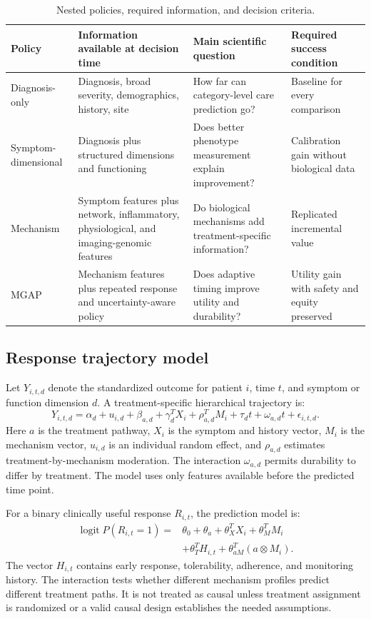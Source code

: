 \documentclass[conference]{IEEEtran}
\begin{document}
\begin{table}[t]
\centering
\caption{Nested policies, required information, and decision criteria.}
\label{tab:policies}
\small
\begin{tabular}{p{3.0cm}p{4.3cm}p{4.3cm}p{3.0cm}}
\toprule
Policy & Information available at decision time & Main scientific question & Required success condition \\
\midrule
Diagnosis-only & Diagnosis, broad severity, demographics, history, site & How far can category-level care prediction go? & Baseline for every comparison \\
Symptom-dimensional & Diagnosis plus structured dimensions and functioning & Does better phenotype measurement explain improvement? & Calibration gain without biological data \\
Mechanism & Symptom features plus network, inflammatory, physiological, and imaging-genomic features & Do biological mechanisms add treatment-specific information? & Replicated incremental value \\
MGAP & Mechanism features plus repeated response and uncertainty-aware policy & Does adaptive timing improve utility and durability? & Utility gain with safety and equity preserved \\
\bottomrule
\end{tabular}
\end{table}

\subsection{Response trajectory model}
Let $Y_{i,t,d}$ denote the standardized outcome for patient $i$, time $t$, and symptom or function dimension $d$. A treatment-specific hierarchical trajectory is:
\begin{equation}
Y_{i,t,d}=\alpha_d+u_{i,d}+\beta_{a,d}+\gamma_d^T X_i+\rho_{a,d}^T M_i+\tau_d t+\omega_{a,d}t+\epsilon_{i,t,d}.
\label{eq:trajectory}
\end{equation}
Here $a$ is the treatment pathway, $X_i$ is the symptom and history vector, $M_i$ is the mechanism vector, $u_{i,d}$ is an individual random effect, and $\rho_{a,d}$ estimates treatment-by-mechanism moderation. The interaction $\omega_{a,d}$ permits durability to differ by treatment. The model uses only features available before the predicted time point.

For a binary clinically useful response $R_{i,t}$, the prediction model is:
\begin{equation}
\begin{aligned}
\operatorname{logit}P(R_{i,t}=1)={}&\theta_0+\theta_a+\theta_X^T X_i+\theta_M^T M_i\\
&+\theta_T^T H_{i,t}+\theta_{aM}^T(a\otimes M_i).
\end{aligned}
\label{eq:response}
\end{equation}
The vector $H_{i,t}$ contains early response, tolerability, adherence, and monitoring history. The interaction tests whether different mechanism profiles predict different treatment paths. It is not treated as causal unless treatment assignment is randomized or a valid causal design establishes the needed assumptions.
\end{document}
